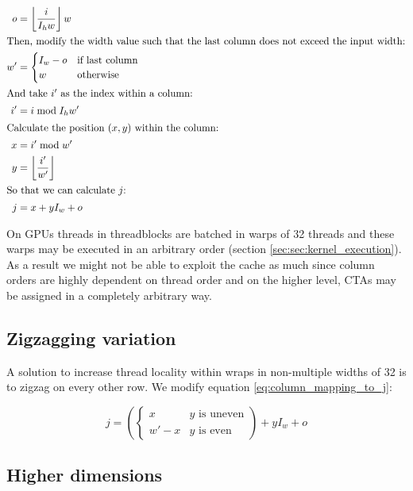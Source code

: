 \begin{align}
    o  &= \left\lfloor \frac{i}{I_h w} \right\rfloor w
    \\ \intertext{Then, modify the width value such that the last column does not exceed the input width:}
    w' &= \begin{cases}
        I_w - o& \text{if last column}
        \\
        w & \text{otherwise}
    \end{cases}
    \\ \intertext{And take $i'$ as the index within a column:}
    i' &= i \bmod I_h w'
    \\ \intertext{Calculate the position $(x, y)$ within the column:}
    x & = i' \bmod w'
    \\ 
    y & = \left\lfloor \frac{i'}{w'} \right\rfloor
    \\ \intertext{So that we can calculate $j$:}
    \label{eq:column_mapping_to_j}
    j  &= x + y I_w + o
\end{align}

On GPUs threads in threadblocks are batched in warps of 32 threads and these warps may be executed in an arbitrary order (section \ref{sec:sec:kernel_execution}).
As a result we might not be able to exploit the cache as much since column orders are highly dependent on thread order and on the higher level, CTAs may be assigned in a completely arbitrary way.

\subsection{Zigzagging variation}

A solution to increase thread locality within wraps in non-multiple widths of 32 is to zigzag on every other row.
We modify equation \ref{eq:column_mapping_to_j}:

\begin{equation}
    j = \left(\begin{cases}
        x & y \text{ is uneven}
        \\
        w' - x & y \text{ is even}
    \end{cases}\right)  + y I_w + o
\end{equation}


\subsection{Higher dimensions}

